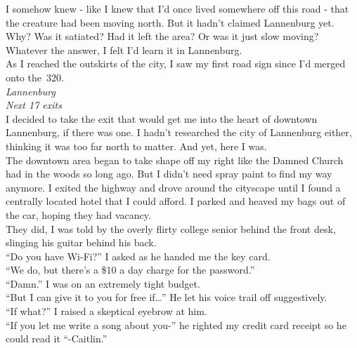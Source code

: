 \documentclass[a5paper]{scrartcl}
\begin{document}
I somehow knew - like I knew that I'd once lived somewhere off this road - that the creature had been moving north. But it hadn't claimed Lannenburg yet. Why? Was it satiated? Had it left the area? Or was it just slow moving? Whatever the answer, I felt I'd learn it in Lannenburg.\\


As I reached the outskirts of the city, I saw my first road sign since I'd merged onto the~320.\\


\textit{Lannenburg}
\\


\textit{Next 17 exits}
\\


I decided to take the exit that would get me into the heart of downtown Lannenburg, if there was one. I hadn't researched the city of Lannenburg either, thinking it was too far north to matter. And yet, here I was.\\


The downtown area began to take shape off my right like the Damned Church had in the woods so long ago. But I didn't need spray paint to find my way anymore. I exited the highway and drove around the cityscape until I found a centrally located hotel that I could afford. I parked and heaved my bags out of the car, hoping they had vacancy.\\


They did, I was told by the overly flirty college senior behind the front desk, slinging his guitar behind his back.\\


\enquote{Do you have Wi-Fi?} I asked as he handed me the key card.\\


\enquote{We do, but there's a \$10 a day charge for the password.}\\


\enquote{Damn.} I was on an extremely tight budget.\\


\enquote{But I can give it to you for free if\dots } He let his voice trail off suggestively.\\


\enquote{If what?} I raised a skeptical eyebrow at him.\\


\enquote{If you let me write a song about you-}  he righted my credit card receipt so he could read it \enquote{-Caitlin.}\\
\end{document}
